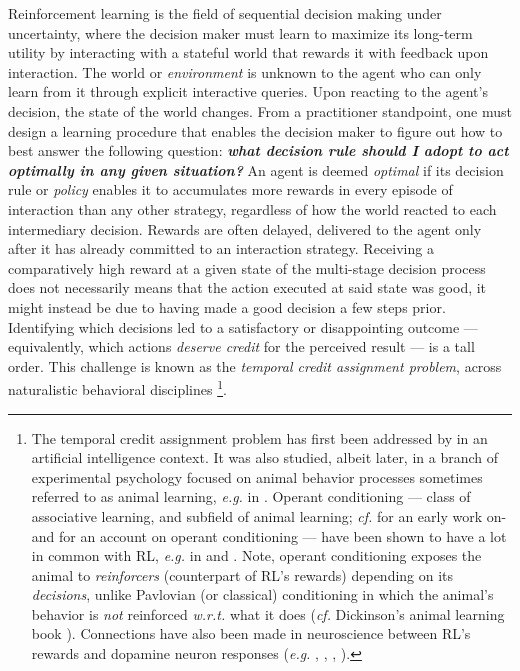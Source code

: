 Reinforcement learning is the field of
sequential decision making under uncertainty,
where the decision maker must learn to maximize its long-term utility
by interacting with a stateful world that rewards it with feedback upon interaction.
The world or \emph{environment} is unknown to the agent who can only learn from it through explicit
interactive queries.
Upon reacting to the agent's decision, the state of the world changes.
From a practitioner standpoint, one must design a learning procedure
that enables the decision maker to figure out how to best answer the following question:
\textbf{\emph{what decision rule should I adopt to act \emph{optimally} in any given situation?}}
An agent is deemed \emph{optimal} if its decision rule or \emph{policy} enables it to
accumulates more rewards in every episode of interaction
than any other strategy,
regardless of how the world reacted to each intermediary decision.
Rewards are often delayed, delivered to the agent only after it has already committed
to an interaction strategy.
Receiving a comparatively high reward at a given state of the multi-stage decision process does not
necessarily means that the action executed at said state was good,
it might instead be due to having made a good decision a few steps prior.
Identifying which decisions led to a satisfactory or disappointing outcome
--- equivalently, which actions \emph{deserve credit} for the perceived result --- is a tall order.
This challenge is known as the \emph{temporal credit assignment problem},
across naturalistic behavioral disciplines
\footnote{
The temporal credit assignment problem has first been addressed by \cite{Minsky1961-qb}
in an artificial intelligence context.
It was also studied, albeit later,
in a branch of experimental psychology focused on animal behavior processes sometimes
referred to as animal learning, \textit{e.g.} in \cite{Mackintosh1975-yg}.
Operant conditioning --- class of associative learning, and subfield of animal learning;
\textit{cf.} \cite{Skinner1948-nh} for an early work on- and \cite{Mackintosh1983-kd} for an account on
operant conditioning
---
have been shown to have a lot in common with RL,
\textit{e.g.} in \cite{Schmajuk1997-hq} and \cite{Touretzky1997-tm}.
Note, operant conditioning exposes the animal to \textit{reinforcers} (counterpart of RL's rewards)
depending on its \emph{decisions}, unlike Pavlovian (or classical) conditioning in which the animal's
behavior is \emph{not} reinforced \textit{w.r.t.} what it does
(\textit{cf.} Dickinson's animal learning book \cite{Dickinson1980-oq}).
Connections have also been made in neuroscience between RL's rewards and
dopamine neuron responses
(\textit{e.g.} \cite{Ljungberg1992-fr}, \cite{Montague1996-iy}, \cite{Schultz1997-xx}, \cite{Dabney2020-nm}).
}.

